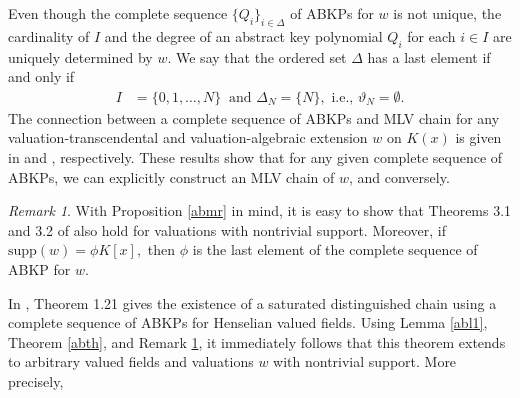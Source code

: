 \documentclass[11pt]{amsart}
\theoremstyle{definition}
\newtheorem{definition}[theorem]{Definition}
\theoremstyle{remark}
\newtheorem{remark}[theorem]{Remark}
\numberwithin{equation}{section}
\begin{document}
	Even though the complete sequence $\{Q_i\}_{i\in\Delta}$  of ABKPs  for $w$  is not unique, the cardinality of $I$ and the degree of an abstract key polynomial $Q_i$ for each $i\in I$ are uniquely determined by $w.$
	We say that the ordered set $\Delta$ has a last element if and only if  
	\begin{align}
		I&=\{0,1,\ldots,N\}~\text { and  
			$\Delta_N=\{N\},$ i.e., $\vartheta_N=\emptyset.$}
	\end{align}
	The connection between a complete sequence of ABKPs and MLV chain for any valuation-transcendental and valuation-algebraic extension $w$ on $K(x)$ is given in \cite{SA1} and \cite{SA2}, respectively. These results show that for any given complete sequence of ABKPs, we can explicitly construct an MLV chain of $w$, and conversely.
	\begin{remark}\label{ntsr}
		With Proposition \ref{abmr} in mind, it is easy to  show that Theorems 3.1 and 3.2 of \cite{SA1} also hold for valuations with nontrivial support. Moreover, if $\text{supp}(w)=\phi K[x],$ then $\phi$ is the last element of the complete sequence of ABKP for $w.$
	\end{remark}
	
	 In \cite{SA3}, Theorem 1.21 gives the existence of a saturated distinguished chain using a complete sequence of ABKPs for Henselian valued fields. Using Lemma \ref{abl1}, Theorem \ref{abth}, and Remark \ref{ntsr}, it immediately follows that this theorem extends to arbitrary valued fields and valuations $w$ with nontrivial support. More precisely,
	
\end{document}
